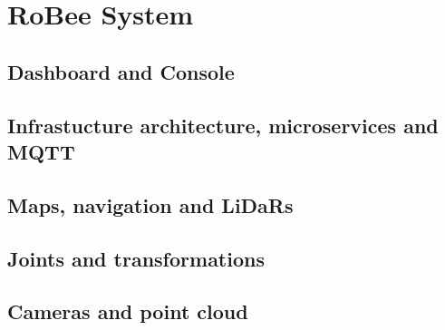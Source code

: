 \chapter{RoBee System}


\section{Dashboard and Console}

\section{Infrastucture architecture, microservices and MQTT}

\section{Maps, navigation and LiDaRs}

\section{Joints and transformations}

\section{Cameras and point cloud}

